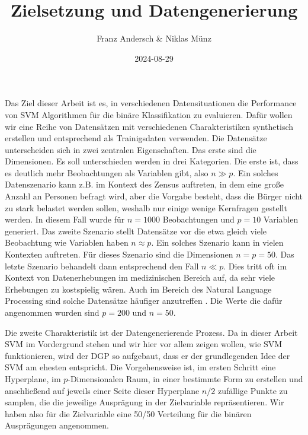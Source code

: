 \documentclass[
]{article}
\title{Zielsetzung und Datengenerierung}
\author{Franz Andersch \& Niklas Münz}
\date{2024-08-29}
\renewcommand{\maketitle}{}
\begin{document}
\maketitle

Das Ziel dieser Arbeit ist es, in verschiedenen Datensituationen die
Performance von SVM Algorithmen für die binäre Klassifikation zu
evaluieren. Dafür wollen wir eine Reihe von Datensätzen mit
verschiedenen Charakteristiken synthetisch erstellen und entsprechend
als Trainigsdaten verwenden. Die Datensätze unterscheiden sich in zwei
zentralen Eigenschaften. Das erste sind die Dimensionen. Es soll
unterschieden werden in drei Kategorien. Die erste ist, dass es deutlich
mehr Beobachtungen als Variablen gibt, also \(n \gg p\). Ein solches
Datenszenario kann z.B. im Kontext des Zensus auftreten, in dem eine
große Anzahl an Personen befragt wird, aber die Vorgabe besteht, dass
die Bürger nicht zu stark belastet werden sollen, weshalb nur einige
wenige Kernfragen gestellt werden. In diesem Fall wurde für \(n=1000\)
Beobachtungen und \(p=10\) Variablen generiert. Das zweite Szenario
stellt Datensätze vor die etwa gleich viele Beobachtung wie Variablen
haben \(n \approx p\). Ein solches Szenario kann in vielen Kontexten
auftreten. Für dieses Szenario sind die Dimensionen \(n=p=50\). Das
letzte Szenario behandelt dann entsprechend den Fall \(n \ll p\). Dies
tritt oft im Kontext von Datenerhebungen im medizinischen Bereich auf,
da sehr viele Erhebungen zu kostspielig wären. Auch im Bereich des
Natural Language Processing sind solche Datensätze häufiger anzutreffen
\parencite{scholzComparisonClassificationMethods2021}. Die Werte die
dafür angenommen wurden sind \(p=200\) und \(n=50\).

Die zweite Charakteristik ist der Datengenerierende Prozess. Da in
dieser Arbeit SVM im Vordergrund stehen und wir hier vor allem zeigen
wollen, wie SVM funktionieren, wird der DGP so aufgebaut, dass er der
grundlegenden Idee der SVM am ehesten entspricht. Die Vorgehensweise
ist, im ersten Schritt eine Hyperplane, im \(p\)-Dimensionalen Raum, in
einer bestimmte Form zu erstellen und anschließend auf jeweils einer
Seite dieser Hyperplane \(n/2\) zufällige Punkte zu samplen, die die
jeweilige Ausprägung in der Zielvariable repräsentieren. Wir haben also
für die Zielvariable eine 50/50 Verteilung für die binären Ausprägungen
angenommen.
\end{document}
